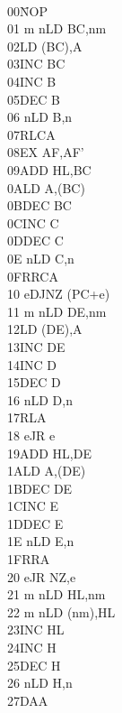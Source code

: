 \setlength\columnsep{4em}
\begin{multicols}{3}
{
    \tt 
    \footnotesize
    \begin{tabbing}
    00{\qquad}{\qquad}{\quad}\=NOP\\
    01 m n\>LD BC,nm\\
    02\>LD (BC),A\\
    03\>INC BC\\
    04\>INC B\\
    05\>DEC B\\
    06 n\>LD B,n\\
    07\>RLCA\\
    08\>EX AF,AF'\\
    09\>ADD HL,BC\\
    0A\>LD A,(BC)\\
    0B\>DEC BC\\
    0C\>INC C\\
    0D\>DEC C\\
    0E n\>LD C,n\\
    0F\>RRCA\\
    10 e\>DJNZ (PC+e)\\
    11 m n\>LD DE,nm\\
    12\>LD (DE),A\\
    13\>INC DE\\
    14\>INC D\\
    15\>DEC D\\
    16 n\>LD D,n\\
    17\>RLA\\
    18 e\>JR e\\
    19\>ADD HL,DE\\
    1A\>LD A,(DE)\\
    1B\>DEC DE\\
    1C\>INC E\\
    1D\>DEC E\\
    1E n\>LD E,n\\
    1F\>RRA\\
    20 e\>JR NZ,e\\
    21 m n\>LD HL,nm\\
    22 m n\>LD (nm),HL\\
    23\>INC HL\\
    24\>INC H\\
    25\>DEC H\\
    26 n\>LD H,n\\
    27\>DAA\\

\end{tabbing}}
\end{multicols}
